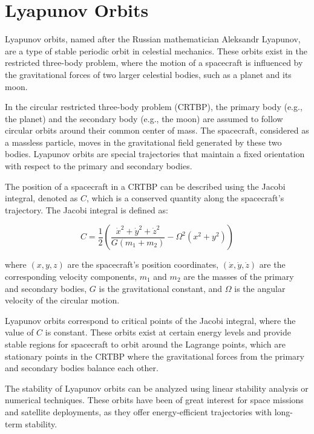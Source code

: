 \documentclass{article}
\begin{document}
\section{Lyapunov Orbits}

Lyapunov orbits, named after the Russian mathematician Aleksandr Lyapunov, are a type of stable periodic orbit in celestial mechanics. These orbits exist in the restricted three-body problem, where the motion of a spacecraft is influenced by the gravitational forces of two larger celestial bodies, such as a planet and its moon.

In the circular restricted three-body problem (CRTBP), the primary body (e.g., the planet) and the secondary body (e.g., the moon) are assumed to follow circular orbits around their common center of mass. The spacecraft, considered as a massless particle, moves in the gravitational field generated by these two bodies. Lyapunov orbits are special trajectories that maintain a fixed orientation with respect to the primary and secondary bodies.

The position of a spacecraft in a CRTBP can be described using the Jacobi integral, denoted as $C$, which is a conserved quantity along the spacecraft's trajectory. The Jacobi integral is defined as:

\begin{equation}
C = \frac{1}{2} \left(\frac{{\dot{x}}^2 + {\dot{y}}^2 + {\dot{z}}^2}{G(m_1 + m_2)} - \Omega^2(x^2 + y^2) \right)
\end{equation}

where $(x, y, z)$ are the spacecraft's position coordinates, $(\dot{x}, \dot{y}, \dot{z})$ are the corresponding velocity components, $m_1$ and $m_2$ are the masses of the primary and secondary bodies, $G$ is the gravitational constant, and $\Omega$ is the angular velocity of the circular motion.

Lyapunov orbits correspond to critical points of the Jacobi integral, where the value of $C$ is constant. These orbits exist at certain energy levels and provide stable regions for spacecraft to orbit around the Lagrange points, which are stationary points in the CRTBP where the gravitational forces from the primary and secondary bodies balance each other.

The stability of Lyapunov orbits can be analyzed using linear stability analysis or numerical techniques. These orbits have been of great interest for space missions and satellite deployments, as they offer energy-efficient trajectories with long-term stability.
\end{document}
